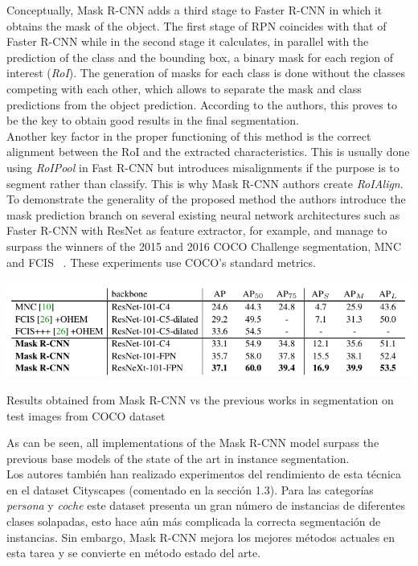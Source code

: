 \documentclass{bmvc2k}
\begin{document}
Conceptually, Mask R-CNN adds a third stage to Faster R-CNN in which it obtains the mask of the object. The first stage of RPN coincides with that of Faster R-CNN while in the second stage it calculates, in parallel with the prediction of the class and the bounding box, a binary mask for each region of interest (\textit{RoI}). The generation of masks for each class is done without the classes competing with each other, which allows to separate the mask and class predictions from the object prediction. According to the authors, this proves to be the key to obtain good results in the final segmentation.\\ 
Another key factor in the proper functioning of this method is the correct alignment between the RoI and the extracted characteristics. This is usually done using \textit{RoIPool} in Fast R-CNN but introduces misalignments if the purpose is to segment rather than classify. This is why Mask R-CNN authors create \textit{RoIAlign}. To demonstrate the generality of the proposed method the authors introduce the mask prediction branch on several existing neural network architectures such as Faster R-CNN with ResNet as feature extractor, for example, and manage to surpass the winners of the 2015 and 2016 COCO Challenge segmentation, MNC ~\cite{dai2016instance} and FCIS ~\cite{li2016fully}. These experiments use COCO's standard metrics.\\
\begin{table}[h!]
\begin{center}
\includegraphics[scale=0.40]{mask_vs_mnc_fcis.png}
\caption{Results obtained from Mask R-CNN vs the previous works in segmentation on test images from COCO dataset}
\end{center}
\end{table}
As can be seen, all implementations of the Mask R-CNN model surpass the previous base models of the state of the art in instance segmentation.\\
Los autores también han realizado experimentos del rendimiento de esta técnica en el dataset Cityscapes (comentado en la sección 1.3). Para las categorías \textit{persona} y \textit{coche} este dataset presenta un gran número de instancias de diferentes clases solapadas, esto hace aún más complicada la correcta segmentación de instancias. Sin embargo, Mask R-CNN mejora los mejores métodos actuales en esta tarea y se convierte en método estado del arte. %
{}
\end{document}
